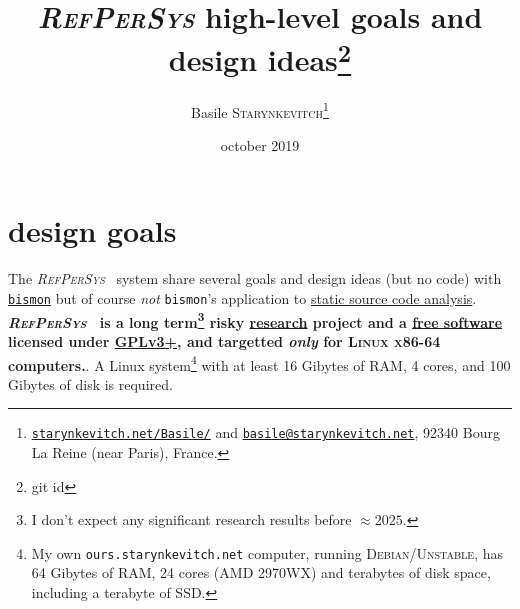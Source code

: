 \documentclass[11pt,a4paper,svgnames]{article}
\date{october 2019}
\newcommand{\mygitid}{\luadirect{tex.print(gitid)}}
\newcommand{\RefPerSys}{{\textit{\textsc{RefPerSys}}}}
\begin{document}
\title {\textit{\textsc{RefPerSys}} high-level goals and design
  ideas\thanks{git id \texttt{\mygitid}}}
\author {Basile
  \textsc{Starynkevitch}\thanks{\href{http://starynkevitch.net/Basile/}{\texttt{starynkevitch.net/Basile/}}
    and
    \href{mailto:basile@starynkevitch.net}{\texttt{basile@starynkevitch.net}},
    92340 Bourg La Reine {(near Paris)}, France.}}

\maketitle

\section{design goals}

The \RefPerSys~ system share several goals and design ideas (but no
code) with \href{http://github.com/bstarynk/bismon}{\texttt{bismon}}
\cite{Starynkevitch:2019:bismon-draft} but of course \emph{not}
\texttt{bismon}'s application to
\href{https://en.wikipedia.org/wiki/Static_program_analysis}{static
  source code analysis}. \textbf{\RefPerSys~ is a long term\footnote{I
  don't expect any significant research results before $\approx
  2025$.}  risky
  \href{https://en.wikipedia.org/wiki/Research}{research} project and
  a \href{https://www.gnu.org/philosophy/free-sw.en.html}{free
    software} licensed under
  \href{https://www.gnu.org/licenses/gpl-3.0.html}{GPLv3+}, and
  targetted \emph{only} for \textsc{Linux x86-64} computers.}. A Linux
system\footnote{My own \texttt{ours.starynkevitch.net} computer, running \textsc{Debian/Unstable}, has 64
Gibytes of RAM, 24 cores (AMD 2970WX) and terabytes of disk space, including a terabyte of SSD.}
with at least 16 Gibytes of RAM, 4 cores, and 100 Gibytes of disk is
required.


\clearpage


\printbibliography
\end{document}

